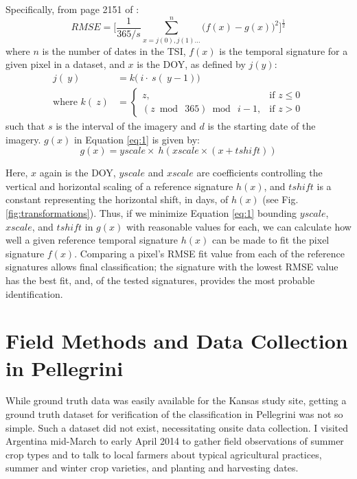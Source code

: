 Specifically, from page 2151 of \textcite{sakamoto2010a-two-step}:
\begin{equation}
\label{eq:1}
  RMSE = \biggl[\frac{1}{365/s}\sum_{x=j(0), j(1)…}^{n}\bigl(f\left(x\right)-g\left(x\right)\bigr)^{2}\biggr]^{\frac{1}{2}}
\end{equation}
where $n$ is the number of dates in the TSI, $f(x)$ is the temporal signature for a given pixel in a dataset, and $x$ is the DOY, as defined by $j(y)$:
\begin{subequations}
\label{eq:DOYcalc}
  \begin{align}
    j\left(~y\right) &= k\bigl(~i\cdot~s\left(~y - 1\right)\bigr) \label{eq:jofy}\\
    \text{where\ \ \ \ } k\left(~z\right) &=
    \begin{cases}
      z, & \mbox{if } z \leq 0\\
      \left(z\bmod~365\right)\bmod~i-1, & \mbox{if } z > 0
    \end{cases} \label{eq:kofz}
  \end{align}
\end{subequations}
such that $s$ is the interval of the imagery and $d$ is the starting date of the imagery. $g(x)$ in Equation \ref{eq:1} is given by:
\begin{equation}
\label{eq:gofx}
  g(x) = yscale\times~h\left(xscale\times(x + tshift)\right)
\end{equation}

Here, $x$ again is the DOY, $yscale$ and  $xscale$ are coefficients controlling the vertical and horizontal scaling of a reference signature $h(x)$, and $tshift$ is a constant representing the horizontal shift, in days, of $h(x)$ (see Fig. \ref{fig:transformations}). Thus, if we minimize Equation \ref{eq:1} bounding $yscale$, $xscale$, and $tshift$  in $g(x)$ with reasonable values for each, we can calculate how well a given reference temporal signature $h(x)$ can be made to fit the pixel signature $f(x)$. Comparing a pixel's RMSE fit value from each of the reference signatures allows final classification; the signature with the lowest RMSE value has the best fit, and, of the tested signatures, provides the most probable identification.

\section{Field Methods and Data Collection in Pellegrini}

While ground truth data was easily available for the Kansas study site, getting a ground truth dataset for verification of the classification in Pellegrini was not so simple. Such a dataset did not exist, necessitating onsite data collection. I visited Argentina mid-March to early April 2014 to gather field observations of summer crop types and to talk to local farmers about typical agricultural practices, summer and winter crop varieties, and planting and harvesting dates.

